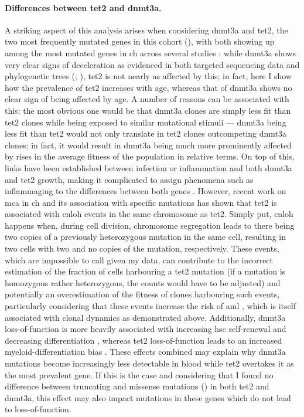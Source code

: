 \paragraph{Differences between \ac{tet2} and \ac{dnmt3a}.} A striking aspect of this analysis arises when considering \ac{dnmt3a} and \ac{tet2}, the two most frequently mutated genes in this cohort (), with both showing up among the most mutated genes in \ac{ch} across several studies \cite{Jaiswal2014-rl,Genovese2014-eu,Dawoud2020-af}: while \ac{dnmt3a} shows very clear signs of deceleration as evidenced in both targeted sequencing data and phylogenetic trees (; ), \ac{tet2} is not nearly as affected by this; in fact, here I show how the prevalence of \ac{tet2} increases with age, whereas that of \ac{dnmt3a} shows no clear sign of being affected by age. A number of reasons can be associated with this: the most obvious one would be that \ac{dnmt3a} clones are simply less fit than \ac{tet2} clones while being exposed to similar mutational stimuli --- \ac{dnmt3a} being less fit than \ac{tet2} would not only translate in \ac{tet2} clones outcompeting \ac{dnmt3a} clones; in fact, it would result in \ac{dnmt3a} being much more prominently affected by rises in the average fitness of the population in relative terms. On top of this, links have been established between infection or inflammation and both \ac{dnmt3a} \cite{Hormaechea_Agulla2019-cd,Hormaechea-Agulla2021-kr} and \ac{tet2} \cite{Cai2018-yi} growth, making it complicated to assign phenomena such as inflammaging to the differences between both genes \cite{Franceschi2018-be}. However, recent work on \ac{mca} in \ac{ch} and its association with specific mutations has shown that \ac{tet2} is associated with \ac{cnloh} events in the same chromosome as \ac{tet2}. Simply put, \ac{cnloh} happens when, during cell division, chromosome segregation leads to there being two copies of a previously heterozygous mutation in the same cell, resulting in two cells with two and no copies of the mutation, respectively. These events, which are impossible to call given my data, can contribute to the incorrect estimation of the fraction of cells harbouring a \ac{tet2} mutation (if a mutation is homozygous rather heterozygous, the counts would have to be adjusted) and potentially an overestimation of the fitness of clones harbouring such events, particularly considering that these events increase the risk of \ac{aml} \cite{Gao2021-ph}, which is itself associated with clonal dynamics as demonstrated above. Additionally, \ac{dnmt3a} loss-of-function is more heavily associated with increasing \ac{hsc} self-renewal and decreasing differentiation \cite{Jeong2018-pn}, whereas \ac{tet2} loss-of-function leads to an increased myeloid-differentiation bias \cite{Zhang2016-ys}. These effects combined may explain why \ac{dnmt3a} mutations become increasingly less detectable in blood while \ac{tet2} overtakes it as the most prevalent gene. If this is the case and considering that I found no difference between truncating and missense mutations () in both \ac{tet2} and \ac{dnmt3a}, this effect may also impact mutations in these genes which do not lead to loss-of-function. 

